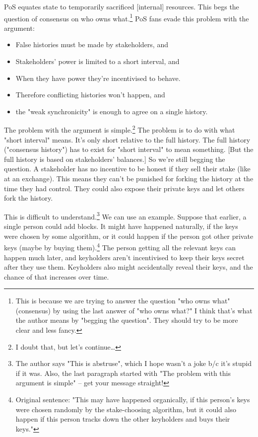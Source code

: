 \documentclass{article}
\begin{document}
PoS equates state to temporarily sacrificed [internal] resources. This begs the question of consensus on who owns what.\footnote{This is because we are trying to answer the question "who owns what" (consensus) by using the last answer of "who owns what?" I think that's what the author means by "begging the question". They should try to be more clear and less fancy.} PoS fans evade this problem with the argument:
\begin{itemize}
    \item False histories must be made by stakeholders, and
    \item Stakeholders' power is limited to a short interval, and
    \item When they have power they're incentivised to behave.
    \item Therefore conflicting histories won't happen, and
    \item the "weak synchronicity" is enough to agree on a single history.
\end{itemize}

The problem with the argument is simple.\footnote{I doubt that, but let's continue\dots} 
The problem is to do with what "short interval" means.
It's only short relative to the full history.
The full history ("consensus history") has to exist for "short interval" to mean something.
[But the full history is based on stakeholders' balances.]
So we're still begging the question.
A stakeholder has no incentive to be honest if they sell their stake (like at an exchange).
This means they can't be punished for forking the history at the time they had control.
They could also expose their private keys and let others fork the history.

This is difficult to understand.\footnote{The author says "This is abstruse", which I hope wasn't a joke b/c it's stupid if it was. Also, the last paragraph started with "The problem with this argument is simple" -- get your message straight!}
We can use an example.
Suppose that earlier, a single person could add blocks.
\label{def:ex10}
\hypertarget{ex10}{It might have happened naturally, if the keys were chosen by some algorithm, or it could happen if the person got other private keys (maybe by buying them).}\footnote{Original sentence: "This may have happened organically, if this person’s keys were chosen randomly by the stake-choosing algorithm, but it could also happen if this person tracks down the other keyholders and buys their keys."}
The person getting all the relevant keys can happen much later, and keyholders aren't incentivised to keep their keys secret after they use them. Keyholders also might accidentally reveal their keys, and the chance of that increases over time.
\end{document}
